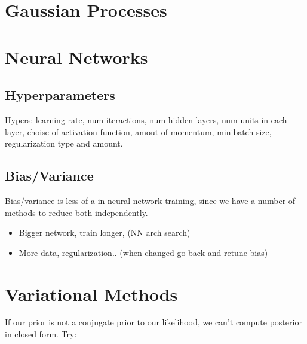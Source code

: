 \documentclass[11pt]{article}
\begin{document}
\section{Gaussian Processes}
\label{sec:gp}



\section{Neural Networks}
\label{sec:nn}

\subsection{Hyperparameters}
Hypers: learning rate, num iteractions, num hidden layers, num units in each layer,
choise of activation function, amout of momentum, minibatch size, regularization type
and amount.

\subsection{Bias/Variance}

Bias/variance is less of a  in neural network training, since we have a
number of methods to reduce both independently.
\begin{itemize}
  \item {} Bigger network, train longer, (NN arch
  search)
  \item {} More data, regularization.. (when changed
  go back and retune bias)
\end{itemize}


\section{Variational Methods}
\label{sec:var_meth}

If our prior is not a conjugate prior to our likelihood, we can't compute posterior in
closed form. Try:
\end{document}
